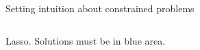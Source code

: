 \documentclass[mathserif, aspectratio=169]{beamer}
\begin{document}
\begin{frame}{Setting intuition about constrained problems}
\begin{columns}
\begin{center}
Lasso.   Solutions must be in blue area.
\end{center}


\end{columns}
\end{frame}
\end{document}
